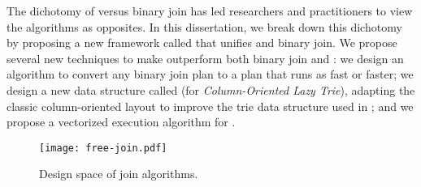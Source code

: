 The dichotomy of \WCOJ versus binary join has led researchers 
  and practitioners to view the algorithms as opposites.
In this dissertation, we break down this dichotomy by proposing
  a new framework called \FJ that unifies \WCOJ and binary join.
%
We propose several new techniques to make \FJ outperform
both binary join and \WCOJ:
we design an algorithm to convert any binary join plan to a \FJ plan
that runs as fast or faster; we design a new data structure called
\COLT (for \emph{Column-Oriented Lazy Trie}), adapting the classic
column-oriented layout to improve the trie data structure used in
\WCOJ; and we propose a vectorized execution algorithm for \FJ.

\begin{figure}
    \centering
    \texttt{[image: free-join.pdf]}
    \caption{Design space of join algorithms.}
    \label{fig:design-space}
\end{figure}


